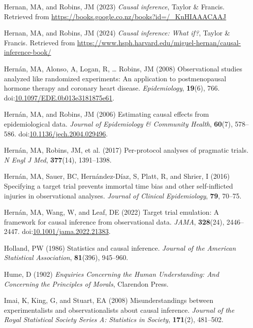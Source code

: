\documentclass[
  single column]{article}
\newlength{\cslhangindent}
\newenvironment{CSLReferences}[2] %
 {\begin{list}{}{%
  \setlength{\itemindent}{0pt}
  \setlength{\leftmargin}{0pt}
  \setlength{\parsep}{0pt}
  \ifodd #1
   \setlength{\leftmargin}{\cslhangindent}
   \setlength{\itemindent}{-1\cslhangindent}
  \fi
  \setlength{\itemsep}{#2\baselineskip}}}
 {\end{list}}
\begin{document}
\begin{CSLReferences}{1}{0}
Hernan, MA, and Robins, JM (2023) \emph{Causal inference}, Taylor \&
Francis. Retrieved from
\url{https://books.google.co.nz/books?id=/_KnHIAAACAAJ}

Hernan, MA, and Robins, JM (2024) \emph{Causal inference: What if?},
Taylor \& Francis. Retrieved from
\url{https://www.hsph.harvard.edu/miguel-hernan/causal-inference-book/}

Hernán, MA, Alonso, A, Logan, R, \ldots{} Robins, JM (2008)
Observational studies analyzed like randomized experiments: An
application to postmenopausal hormone therapy and coronary heart
disease. \emph{Epidemiology}, \textbf{19}(6), 766.
doi:\href{https://doi.org/10.1097/EDE.0b013e3181875e61}{10.1097/EDE.0b013e3181875e61}.

Hernán, MA, and Robins, JM (2006) Estimating causal effects from
epidemiological data. \emph{Journal of Epidemiology \& Community
Health}, \textbf{60}(7), 578--586.
doi:\href{https://doi.org/10.1136/jech.2004.029496}{10.1136/jech.2004.029496}.

Hernán, MA, Robins, JM, et al. (2017) Per-protocol analyses of pragmatic
trials. \emph{N Engl J Med}, \textbf{377}(14), 1391--1398.

Hernán, MA, Sauer, BC, Hernández-Díaz, S, Platt, R, and Shrier, I (2016)
Specifying a target trial prevents immortal time bias and other
self-inflicted injuries in observational analyses. \emph{Journal of
Clinical Epidemiology}, \textbf{79}, 70--75.

Hernán, MA, Wang, W, and Leaf, DE (2022) Target trial emulation: A
framework for causal inference from observational data. \emph{JAMA},
\textbf{328}(24), 2446--2447.
doi:\href{https://doi.org/10.1001/jama.2022.21383}{10.1001/jama.2022.21383}.

Holland, PW (1986) Statistics and causal inference. \emph{Journal of the
American Statistical Association}, \textbf{81}(396), 945--960.

Hume, D (1902) \emph{Enquiries Concerning the Human Understanding: And
Concerning the Principles of Morals}, Clarendon Press.

Imai, K, King, G, and Stuart, EA (2008) Misunderstandings between
experimentalists and observationalists about causal inference.
\emph{Journal of the Royal Statistical Society Series A: Statistics in
Society}, \textbf{171}(2), 481--502.


\end{CSLReferences}
\end{document}
